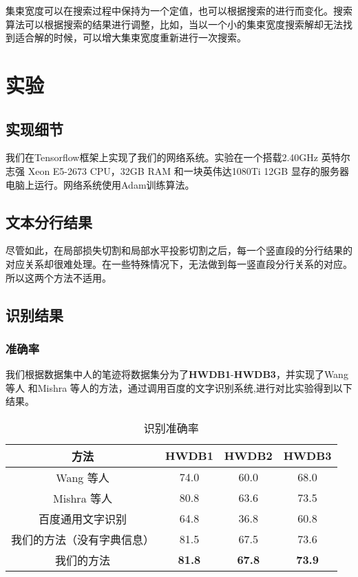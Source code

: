 \documentclass[winfonts]{njuthesis}
\begin{document}
集束宽度可以在搜索过程中保持为一个定值，也可以根据搜索的进行而变化。搜索算法可以根据搜索的结果进行调整，比如，当以一个小的集束宽度搜索解却无法找到适合解的时候，可以增大集束宽度重新进行一次搜索。



\chapter{实验}

\section{实现细节}
我们在Tensorflow框架上实现了我们的网络系统。实验在一个搭载2.40GHz 英特尔志强 Xeon E5-2673 CPU，32GB RAM 和一块英伟达1080Ti 12GB 显存的服务器电脑上运行。网络系统使用Adam训练算法。



\section{文本分行结果}
尽管如此，在局部损失切割和局部水平投影切割之后，每一个竖直段的分行结果的对应关系却很难处理。在一些特殊情况下，无法做到每一竖直段分行关系的对应。所以这两个方法不适用。




\section{识别结果}

\subsection{准确率}
我们根据数据集中人的笔迹将数据集分为了\textbf{HWDB1}-\textbf{HWDB3}，并实现了Wang 等人\cite{wang2012end} 和Mishra 等人\cite{mishra2012scene}的方法，通过调用百度的文字识别系统\cite{baiduapi},进行对比实验得到以下结果。

\vspace{0.2cm}
\begin{table}[htbp]
\setlength{\belowcaptionskip}{5pt}
  \centering
  \begin{tabular}{cccc}
    \toprule
    \textbf{方法} & \textbf{HWDB1} & \textbf{HWDB2} & \textbf{HWDB3} \\
    \midrule
    Wang 等人\cite{wang2012end}   			& 74.0 & 60.0 & 68.0  \\
    Mishra 等人\cite{mishra2012scene}		 	& 80.8 & 63.6 & 73.5  \\
    百度通用文字识别\cite{baiduapi}		& 64.8 & 36.8 & 60.8 \\
    \midrule
    我们的方法（没有字典信息）& 81.5 & 67.5 & 73.6  \\
    我们的方法	  		& \textbf{81.8} & \textbf{67.8} & \textbf{73.9}  \\
    \bottomrule
  \end{tabular}
  \vspace{0.2cm}
  \caption{识别准确率}\label{table:result}
\end{table}
\end{document}
